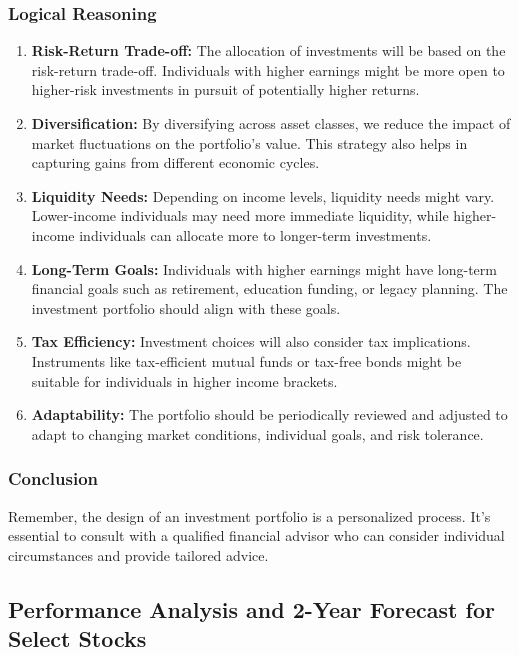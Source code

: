 \subsubsection{Logical Reasoning}
\begin{enumerate}
    \item \textbf{Risk-Return Trade-off:} The allocation of investments will be based on the risk-return trade-off. Individuals with higher earnings might be more open to higher-risk investments in pursuit of potentially higher returns.
    
    \item \textbf{Diversification:} By diversifying across asset classes, we reduce the impact of market fluctuations on the portfolio's value. This strategy also helps in capturing gains from different economic cycles.
    
    \item \textbf{Liquidity Needs:} Depending on income levels, liquidity needs might vary. Lower-income individuals may need more immediate liquidity, while higher-income individuals can allocate more to longer-term investments.
    
    \item \textbf{Long-Term Goals:} Individuals with higher earnings might have long-term financial goals such as retirement, education funding, or legacy planning. The investment portfolio should align with these goals.
    
    \item \textbf{Tax Efficiency:} Investment choices will also consider tax implications. Instruments like tax-efficient mutual funds or tax-free bonds might be suitable for individuals in higher income brackets.
    
    \item \textbf{Adaptability:} The portfolio should be periodically reviewed and adjusted to adapt to changing market conditions, individual goals, and risk tolerance.
\end{enumerate}
\subsubsection{Conclusion}
Remember, the design of an investment portfolio is a personalized process. It's essential to consult with a qualified financial advisor who can consider individual circumstances and provide tailored advice.


\subsection{Performance Analysis and 2-Year Forecast for Select Stocks}

